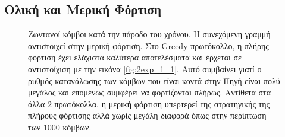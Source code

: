 \subsection{Ολική και Μερική Φόρτιση}\label{subc:result6_2}
\begin{figure}[H]
  \centering
  \caption{Ζωντανοί κόμβοι κατά την πάροδο του χρόνου. Η συνεχόμενη γραμμή αντιστοιχεί στην μερική φόρτιση. Στο Greedy πρωτόκολλο, η πλήρης φόρτιση έχει
ελάχιστα καλύτερα αποτελέσματα και έρχεται σε αντιστοίχιση με την εικόνα \ref{fig:2exp_1_1}. Αυτό συμβαίνει γιατί ο ρυθμός κατανάλωσης των κόμβων που είναι κοντά
στην Πηγή είναι πολύ μεγάλος και επομένως συμφέρει να φορτίζονται πλήρως. Αντίθετα στα άλλα 2 πρωτόκολλα, η μερική φόρτιση υπερτερεί της στρατηγικής της πλήρους
φόρτισης αλλά χωρίς μεγάλη διαφορά όπως στην περίπτωση των 1000 κόμβων.}
  \label{fig:5_2exp_1_1}
\end{figure}

